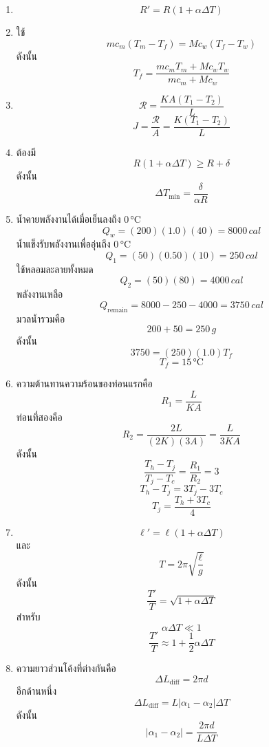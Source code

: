 \begin{enumerate}
    \item
    \[
    R'=R(1+\alpha\Delta T)
    \]

    \item ใช้
    \[
    mc_m(T_m-T_f)=Mc_w(T_f-T_w)
    \]
    ดังนั้น
    \[
    \boxed{
    T_f=
    \frac{mc_mT_m+Mc_wT_w}
    {mc_m+Mc_w}
    }
    \]

    \item
    \[
    \boxed{
    \mathcal{R}=\frac{KA(T_1-T_2)}{L}
    }
    \]
    \[
    \boxed{
    J=\frac{\mathcal{R}}{A}
    =
    \frac{K(T_1-T_2)}{L}
    }
    \]

    \item ต้องมี
    \[
    R(1+\alpha\Delta T)\geq R+\delta
    \]
    ดังนั้น
    \[
    \boxed{
    \Delta T_{\min}=\frac{\delta}{\alpha R}
    }
    \]

    \item น้ำคายพลังงานได้เมื่อเย็นลงถึง $0\,\si{\degreeCelsius}$
    \[
    Q_w=(200)(1.0)(40)=8000\,\si{cal}
    \]
    น้ำแข็งรับพลังงานเพื่ออุ่นถึง $0\,\si{\degreeCelsius}$
    \[
    Q_1=(50)(0.50)(10)=250\,\si{cal}
    \]
    ใช้หลอมละลายทั้งหมด
    \[
    Q_2=(50)(80)=4000\,\si{cal}
    \]
    พลังงานเหลือ
    \[
    Q_{\text{remain}}=8000-250-4000=3750\,\si{cal}
    \]
    มวลน้ำรวมคือ
    \[
    200+50=250\,\si{g}
    \]
    ดังนั้น
    \[
    3750=(250)(1.0)T_f
    \]
    \[
    \boxed{T_f=15\,\si{\degreeCelsius}}
    \]

    \item ความต้านทานความร้อนของท่อนแรกคือ
    \[
    R_1=\frac{L}{KA}
    \]
    ท่อนที่สองคือ
    \[
    R_2=\frac{2L}{(2K)(3A)}
    =
    \frac{L}{3KA}
    \]
    ดังนั้น
    \[
    \frac{T_h-T_j}{T_j-T_c}
    =
    \frac{R_1}{R_2}
    =
    3
    \]
    \[
    T_h-T_j=3T_j-3T_c
    \]
    \[
    \boxed{
    T_j=\frac{T_h+3T_c}{4}
    }
    \]

    \item
    \[
    \ell'=\ell(1+\alpha\Delta T)
    \]
    และ
    \[
    T=2\pi\sqrt{\frac{\ell}{g}}
    \]
    ดังนั้น
    \[
    \boxed{
    \frac{T'}{T}=\sqrt{1+\alpha\Delta T}
    }
    \]
    สำหรับ
    \[
    \alpha\Delta T\ll 1
    \]
    \[
    \boxed{
    \frac{T'}{T}
    \approx
    1+\frac{1}{2}\alpha\Delta T
    }
    \]

    \item ความยาวส่วนโค้งที่ต่างกันคือ
    \[
    \Delta L_{\text{diff}}=2\pi d
    \]
    อีกด้านหนึ่ง
    \[
    \Delta L_{\text{diff}}
    =
    L|\alpha_1-\alpha_2|\Delta T
    \]
    ดังนั้น
    \[
    \boxed{
    |\alpha_1-\alpha_2|
    =
    \frac{2\pi d}{L\Delta T}
    }
    \]


\end{enumerate}
